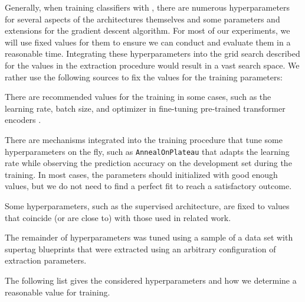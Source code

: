 \documentclass[../../document.tex]{subfiles}
\begin{document}
    Generally, when training classifiers with , there are numerous hyperparameters for several aspects of the architectures themselves and some parameters and extensions for the gradient descent algorithm.
    For most of our experiments, we will use fixed values for them to ensure we can conduct and evaluate them in a reasonable time.
    Integrating these hyperparameters into the grid search described for the values in the extraction procedure would result in a vast search space.
    We rather use the following sources to fix the values for the training parameters:
    \begin{compactitem}
        \item There are recommended values for the training in some cases, such as the learning rate, batch size, and optimizer in fine-tuning pre-trained transformer encoders \citep{Devlin2019}.
        \item There are mechanisms integrated into the training procedure that tune some hyperparameters on the fly, such as \texttt{AnnealOnPlateau} that adapts the learning rate while observing the prediction accuracy on the development set during the training. In most cases, the parameters should initialized with good enough values, but we do not need to find a perfect fit to reach a satisfactory outcome.
        \item Some hyperparameters, such as the supervised architecture, are fixed to values that coincide (or are close to) with those used in related work.
        \item The remainder of hyperparameters was tuned using a sample of a data set with supertag blueprints that were extracted using an arbitrary configuration of extraction parameters.
    \end{compactitem}
    The following list gives the considered hyperparameters and how we determine a reasonable value for training.
\end{document}
